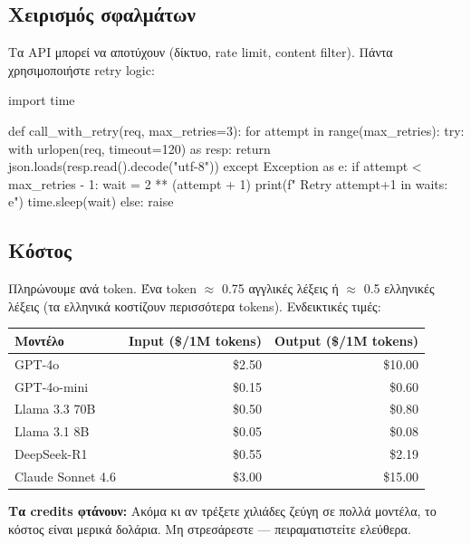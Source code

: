 \documentclass[11pt,a4paper]{article}
\begin{document}
\subsection{Χειρισμός σφαλμάτων}

Τα API μπορεί να αποτύχουν (δίκτυο, rate limit, content filter). Πάντα χρησιμοποιήστε retry logic:

\begin{codeblock}[title={\smallPython --- Retry}]
import time

def call_with_retry(req, max_retries=3):
    for attempt in range(max_retries):
        try:
            with urlopen(req, timeout=120) as resp:
                return json.loads(resp.read().decode("utf-8"))
        except Exception as e:
            if attempt < max_retries - 1:
                wait = 2 ** (attempt + 1)
                print(f"  Retry {attempt+1} in {wait}s: {e}")
                time.sleep(wait)
            else:
                raise
\end{codeblock}

\subsection{Κόστος}

Πληρώνουμε ανά token. Ένα token $\approx$ 0.75 αγγλικές λέξεις ή $\approx$ 0.5 ελληνικές λέξεις (τα ελληνικά κοστίζουν περισσότερα tokens). Ενδεικτικές τιμές:

\begin{table}[h!]
\centering\small
\begin{tabular}{l r r}
\toprule
\textbf{Μοντέλο} & \textbf{Input (\$/1M tokens)} & \textbf{Output (\$/1M tokens)} \\
\midrule
GPT-4o & \$2.50 & \$10.00 \\
GPT-4o-mini & \$0.15 & \$0.60 \\
Llama 3.3 70B & \$0.50 & \$0.80 \\
Llama 3.1 8B & \$0.05 & \$0.08 \\
DeepSeek-R1 & \$0.55 & \$2.19 \\
Claude Sonnet 4.6 & \$3.00 & \$15.00 \\
\bottomrule
\end{tabular}
\end{table}

\begin{tcolorbox}[colback=uocblue!5, colframe=uocblue, sharp corners, boxrule=0.5pt]
\textbf{Τα credits φτάνουν:} Ακόμα κι αν τρέξετε χιλιάδες ζεύγη σε πολλά μοντέλα, το κόστος είναι μερικά δολάρια. Μη στρεσάρεστε --- πειραματιστείτε ελεύθερα.
\end{tcolorbox}
\end{document}
